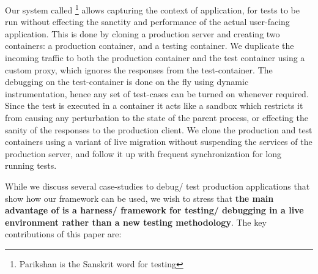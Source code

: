  Our system called \parikshan\footnote{Parikshan is the Sanskrit word for testing} allows capturing the context of application, 
for tests to be run without effecting the sanctity and performance of the actual user-facing application. 
This is done by cloning a production server and creating two containers: a production container, and a testing container. 
We duplicate the incoming traffic to both the production container and the test container using a custom proxy, which ignores the responses from the test-container. 
The debugging on the test-container is done on the fly using dynamic instrumentation, hence any set of test-cases can be turned on whenever required. 
Since the test is executed in a container it acts like a sandbox which restricts it from causing any perturbation to the state of the parent process, or effecting the sanity of the responses to the production client. 
We clone the production and test containers using a variant of live migration without suspending the services of the production server, and follow it up with frequent synchronization for long running tests.

While we discuss several case-studies to debug/ test production applications that show how our framework can be used, we wish to stress that \textbf{the main advantage of \parikshan is a harness/ framework for testing/ debugging in a live environment rather than a new testing methodology}. 
The key contributions of this paper are:

